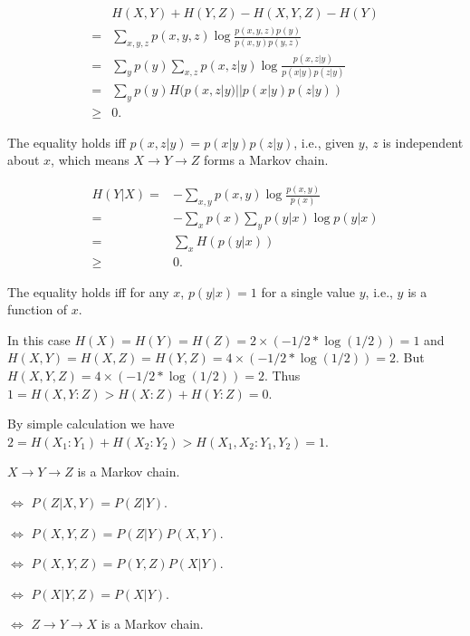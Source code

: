 \ex $$\begin{aligned}
    & H(X,Y)+H(Y,Z)-H(X,Y,Z)-H(Y)
    \\ = & \sum_{x,y,z}p(x,y,z)\log\frac{p(x,y,z)p(y)}{p(x,y)p(y,z)}
    \\ = & \sum_yp(y)\sum_{x,z}p(x,z|y)\log\frac{p(x,z|y)}{p(x|y)p(z|y)}
    \\ = & \sum_yp(y)H(p(x,z|y)||p(x|y)p(z|y))
    \\ \ge & 0.
\end{aligned}$$

The equality holds iff $p(x,z|y)=p(x|y)p(z|y)$, i.e., given $y$, $z$ is independent about $x$, which means $X\rightarrow Y\rightarrow Z$ forms a Markov chain.

\ex $$\begin{aligned}
    H(Y|X) = & -\sum_{x,y}p(x,y)\log\frac{p(x,y)}{p(x)}
    \\ = & -\sum_xp(x)\sum_yp(y|x)\log p(y|x)
    \\ = & \sum_xH(p(y|x))
    \\ \ge & 0.
\end{aligned}$$

The equality holds iff for any $x$, $p(y|x)=1$ for a single value $y$, i.e., $y$ is a function of $x$.

\ex In this case $H(X) = H(Y) = H(Z) = 2 \times (-1/2*\log(1/2)) = 1$ and $H(X, Y) = H(X, Z) = H(Y, Z) = 4 \times (-1/2*\log(1/2)) = 2$.
But $H(X, Y, Z) = 4 \times (-1/2*\log(1/2)) = 2$.
Thus $1 = H(X, Y: Z) > H(X: Z) + H(Y: Z) = 0$.

\ex By simple calculation we have $2 = H(X_1: Y_1) + H(X_2: Y_2) > H(X_1, X_2: Y_1, Y_2) = 1$. 

\ex $X\rightarrow Y\rightarrow Z$ is a Markov chain.

$\Leftrightarrow$ $P(Z| X,Y) = P(Z| Y)$.

$\Leftrightarrow$ $P(X, Y, Z) = P(Z| Y)P(X, Y)$.

$\Leftrightarrow$ $P(X, Y, Z) = P(Y, Z)P(X| Y)$.

$\Leftrightarrow$ $P(X| Y, Z) = P(X| Y)$.

$\Leftrightarrow$ $Z\rightarrow Y\rightarrow X$ is a Markov chain.